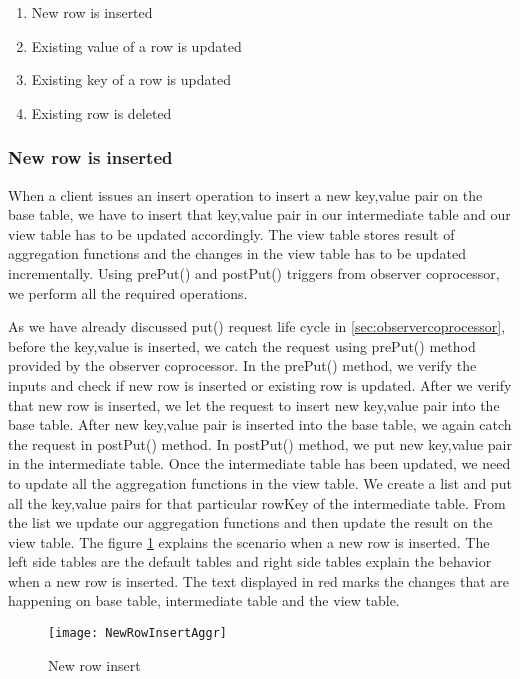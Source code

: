 \documentclass[11pt,a4paper,bibtotoc,idxtotoc,headsepline,footsepline,footexclude,BCOR12mm,DIV13]{scrbook}
\begin{document}
\begin{enumerate}
    \item New row is inserted
    \item Existing value of a row is updated
    \item Existing key of a row is updated
    \item Existing row is deleted
\end{enumerate}

\subsubsection{New row is inserted}
When a client issues an insert operation to insert a new key,value pair on the base table, we have to insert that key,value pair in our intermediate table and our view table has to be updated accordingly. The view table stores result of aggregation functions and the changes in the view table has to be updated incrementally. Using prePut() and postPut() triggers from observer coprocessor, we perform all the required operations.

As we have already discussed put() request life cycle in \ref{sec:observercoprocessor}, before the key,value is inserted, we catch the request using prePut() method provided by the observer coprocessor. In the prePut() method, we verify the inputs and check if new row is inserted or existing row is updated. After we verify that new row is inserted, we let the request to insert new key,value pair into the base table. After new key,value pair is inserted into the base table, we again catch the request in postPut() method. In postPut() method, we put new key,value pair in the intermediate table. Once the intermediate table has been updated, we need to update all the aggregation functions in the view table. We create a list and put all the key,value pairs for that particular rowKey of the intermediate table. From the list we update our aggregation functions and then update the result on the view table. The figure \ref{sec:newrowinsertagggregation} explains the scenario when a new row is inserted. The left side tables are the default tables and right side tables explain the behavior when a new row is inserted. The text displayed in red marks the changes that are happening on base table, intermediate table and  the view table. 
\begin{figure}
    \centering
    \texttt{[image: NewRowInsertAggr]}
    \caption{New row insert}
    \label{sec:newrowinsertagggregation}
    
\end{figure}
\end{document}
